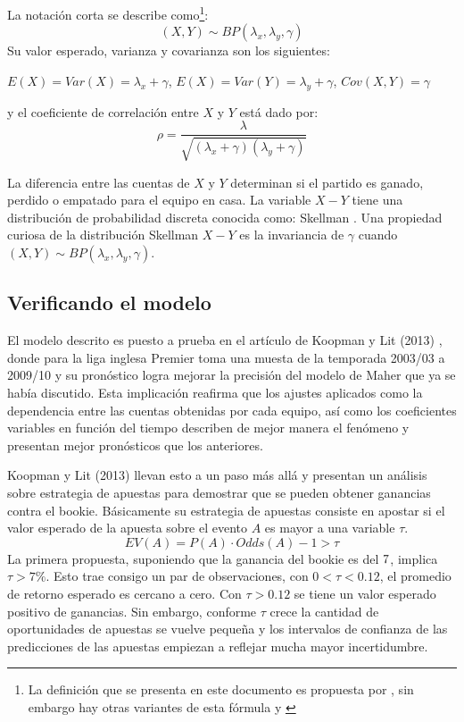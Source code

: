 La notación corta se describe como\footnote{La definición que se presenta en este documento es propuesta por \cite{koopman2013dynamic}, sin embargo hay otras variantes de esta fórmula \cite{kocherlakota1992bivariate} y \cite{johnson1997discrete}}:
\[(X,Y) \sim BP(\lambda_x,\lambda_y,\gamma)\]
Su valor esperado, varianza y covarianza son los siguientes:


$E(X) = Var(X) = \lambda_x + \gamma$, $E(X) = Var(Y) = \lambda_y + \gamma$, $Cov(X,Y) = \gamma$


y el coeficiente de correlación entre $X$ y $Y$ está dado por:
\[\rho = \frac{\lambda}{\sqrt{(\lambda_x+\gamma)(\lambda_y+\gamma)}}\]

La diferencia entre las cuentas de $X$ y $Y$ determinan si el partido es ganado, perdido o empatado para el equipo en casa. La variable $X-Y$ tiene una distribución de probabilidad discreta conocida como: Skellman \cite{skellam1946frequency}. Una propiedad curiosa de la distribución Skellman $X-Y$ es la invariancia de $\gamma$ cuando $(X,Y) \sim BP(\lambda_x,\lambda_y,\gamma)$.

\subsection{Verificando el modelo}
\label{subsec:verification}

El modelo descrito es puesto a prueba en el artículo de Koopman y Lit (2013) \cite{koopman2013dynamic}, donde para la liga inglesa Premier toma una muesta de la temporada 2003/03 a 2009/10 y su pronóstico logra mejorar la precisión del modelo de Maher \cite{maher1982modelling} que ya se había discutido. Esta implicación reafirma que los ajustes aplicados como la dependencia entre las cuentas obtenidas por cada equipo, así como los coeficientes variables en función del tiempo describen de mejor manera el fenómeno y presentan mejor pronósticos que los anteriores.

Koopman y Lit (2013) \cite{koopman2013dynamic} llevan esto a un paso más allá y presentan un análisis sobre estrategia de apuestas para demostrar que se pueden obtener ganancias contra el bookie. Básicamente su estrategia de apuestas consiste en apostar si el valor esperado de la apuesta sobre el evento $A$ es mayor a una variable $\tau$.
\[EV(A) = P(A) \cdot Odds(A) - 1 > \tau\]
La primera propuesta, suponiendo que la ganancia del bookie es del $7\/$, implica $\tau > 7\%$. Esto trae consigo un par de observaciones, con $0<\tau<0.12$, el promedio de retorno esperado es cercano a cero. Con $\tau>0.12$ se tiene un valor esperado positivo de ganancias. Sin embargo, conforme $\tau$ crece  la cantidad de oportunidades de apuestas se vuelve pequeña y los intervalos de confianza de las predicciones de las apuestas empiezan a reflejar mucha mayor incertidumbre.

